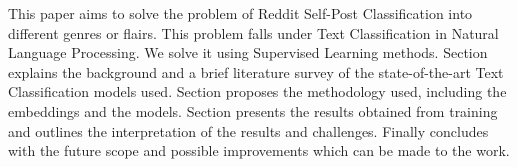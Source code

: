 \documentclass[conference]{IEEEtran}
\newcommand{\RNum}[1]{\uppercase\expandafter{\romannumeral #1\relax}}
\begin{document}
This paper aims to solve the problem of Reddit Self-Post Classification into different genres or flairs. This problem falls under Text Classification in Natural Language Processing. We solve it using Supervised Learning methods. Section \RNum{2} explains the background and a brief literature survey of the state-of-the-art Text Classification models used. Section \RNum{3} proposes the methodology used, including the embeddings and the models. Section \RNum{4} presents the results obtained from training and \RNum{5} outlines the interpretation of the results and challenges. Finally \RNum{6} concludes with the future scope and possible improvements which can be made to the work. 


 





%
%
\end{document}
